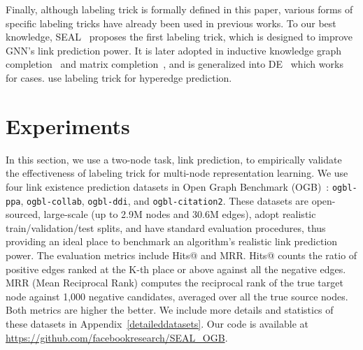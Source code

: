\documentclass{article}
\begin{document}
Finally, although labeling trick is formally defined in this paper, various forms of specific labeling tricks have already been used in previous works. To our best knowledge, SEAL~\citep{zhang2018link} proposes the first labeling trick, which is designed to improve GNN's link prediction power. It is later adopted in inductive knowledge graph completion~\citep{teru2020inductive} and matrix completion~\citep{Zhang2020Inductive}, and is generalized into DE~\citep{li2020distance} which works for  cases. \citet{wan2021principled} use labeling trick for hyperedge prediction.
















\section{Experiments}




In this section, we use a two-node task, link prediction, to empirically validate the effectiveness of labeling trick for multi-node representation learning. We use four link existence prediction datasets in Open Graph Benchmark (OGB)~\citep{hu2020open}: \texttt{ogbl-ppa}, \texttt{ogbl-collab},  \texttt{ogbl-ddi}, and \texttt{ogbl-citation2}. These datasets are open-sourced, large-scale (up to 2.9M nodes and 30.6M edges), adopt realistic train/validation/test splits, and have standard evaluation procedures, thus providing an ideal place to benchmark an algorithm's realistic link prediction power. The evaluation metrics include Hits@ and MRR. Hits@ counts the ratio of positive edges ranked at the K-th place or above against all the negative edges. MRR (Mean Reciprocal Rank) computes the reciprocal rank of the true target node against 1,000 negative candidates, averaged over all the true source nodes. Both metrics are higher the better. We include more details and statistics of these datasets in Appendix~\ref{detaileddatasets}. Our code is available at \url{https://github.com/facebookresearch/SEAL_OGB}.
\end{document}
